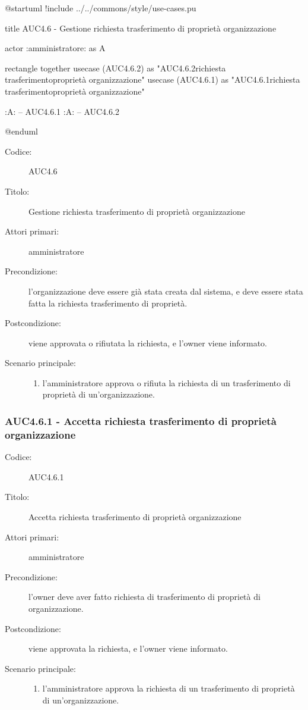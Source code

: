 \documentclass[casi-duso]{subfiles}
\begin{document}
\begin{plantuml}
@startuml
!include ../../commons/style/use-cases.pu

title AUC4.6 - Gestione richiesta trasferimento di proprietà organizzazione

actor :amministratore: as A

rectangle {
  together {
    usecase (AUC4.6.2) as "AUC4.6.2\nRifiuta richiesta trasferimento\ndi proprietà organizzazione"
    usecase (AUC4.6.1) as "AUC4.6.1\nAccetta richiesta trasferimento\ndi proprietà organizzazione"
  }
}

:A: -- AUC4.6.1
:A: -- AUC4.6.2

@enduml
\end{plantuml}

\begin{description}
  \item[Codice:] AUC4.6
  \item[Titolo:] Gestione richiesta trasferimento di proprietà organizzazione
  \item[Attori primari:] amministratore
  \item[Precondizione:] l'organizzazione deve essere già stata creata dal sistema, e deve essere stata fatta la richiesta trasferimento di proprietà.
  \item[Postcondizione:] viene approvata o rifiutata la richiesta, e l'owner viene informato.
  \item[Scenario principale:]
  \begin{enumerate}
    \item l'amministratore approva o rifiuta la richiesta di un trasferimento di proprietà di un'organizzazione.
  \end{enumerate}
\end{description}


\subsubsection{AUC4.6.1 - Accetta richiesta trasferimento di proprietà organizzazione}%
\label{subsub:AUC4.6.1}
\begin{description}
  \item[Codice:] AUC4.6.1
  \item[Titolo:] Accetta richiesta trasferimento di proprietà organizzazione
  \item[Attori primari:] amministratore
  \item[Precondizione:] l'owner deve aver fatto richiesta di trasferimento di proprietà di organizzazione.
  \item[Postcondizione:] viene approvata la richiesta, e l'owner viene informato.
  \item[Scenario principale:]
  \begin{enumerate}
    \item l'amministratore approva la richiesta di un trasferimento di proprietà di un'organizzazione.
  \end{enumerate}
\end{description}  
\end{document}
